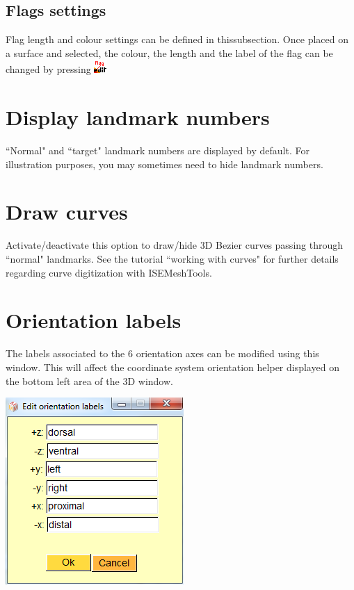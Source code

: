 \subsection{Flags settings}
Flag length and colour settings can be defined in thissubsection. Once placed on a surface and selected, the colour, the length and the label of the flag can be changed by pressing
\includegraphics[scale=0.7]{images/pixmap/Flag02.png}


\section{Display landmark numbers}
``Normal" and ``target" landmark numbers are displayed by default. For illustration purposes, you may sometimes need to hide landmark numbers.

\section{Draw curves}
Activate/deactivate this option to draw/hide 3D Bezier curves passing through ``normal" landmarks. See the tutorial ``working with curves" for further details regarding curve digitization with ISEMeshTools.

\section{Orientation labels}


\noindent
\begin{minipage}{0.55\textwidth}
The labels associated to the 6 orientation axes can be modified using this window. This will affect the coordinate system orientation helper displayed on the bottom left area of the 3D
window.

\end{minipage}  
 \begin{minipage}{0.45\textwidth}\centering
\includegraphics[scale=0.5]{images/Viewing_options/Object_labels.png}

 \end{minipage} 
\noindent





